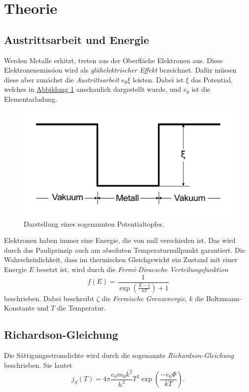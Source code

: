 \section{Theorie}
\label{sec:Theorie}

\subsection{Austrittsarbeit und Energie}

\label{sec:Austrittsarbeit und Energie}
Werden Metalle erhitzt, treten aus der Oberfläche Elektronen aus.
Diese Elektronenemission wird als \textit{glühelektrischer Effekt} bezeichnet.
Dafür müssen diese aber zunächst die \textit{Austrittsarbeit} $e_0 \xi$ leisten.
Dabei ist $\xi$ das Potential, welches in \hyperref[fig:Potentialtopf]{Abbildung \ref{fig:Potentialtopf}} anschaulich dargestellt wurde, und
$e_0$ ist die Elementarladung.
\begin{figure}[h]
    \centering
    \includegraphics[width=0.6\linewidth]{pictures/Potentialtopf.pdf}
    \caption{Darstellung eines sogenannten Potentialtopfes. \cite{v504}}
    \label{fig:Potentialtopf}
\end{figure} 
Elektronen haben immer eine Energie, die von null verschieden ist.
Das wird durch das Pauliprinzip auch am absoluten Temperaturnullpunkt garantiert.
Die Wahrscheinlichkeit, dass im thermischen Gleichgewicht ein Zustand mit einer Energie $E$ besetzt ist, wird durch die
\textit{Fermi-Diracsche Verteilungsfunktion}
\begin{equation}
    f(E)=\frac{1}{\exp \left(\frac{E-\zeta}{k T}\right)+1}
\end{equation}
beschrieben. Dabei beschreibt $\zeta$ die \textit{Fermische Grenzenergie}, $k$ die Boltzmann-Konstante und $T$ die Temperatur.


\subsection{Richardson-Gleichung}

\label{eq:Richardson}
Die Sättigungsstromdichte wird durch die sogenannte \textit{Richardson-Gleichung} \cite{v504} beschrieben. Sie lautet
\begin{equation}
    j_{S}(T)=4 \pi \frac{e_{0} m_{0} k^{2}}{h^{3}} T^{2} \exp \left(\frac{-e_{0} \Phi}{k T}\right) .
\end{equation}


